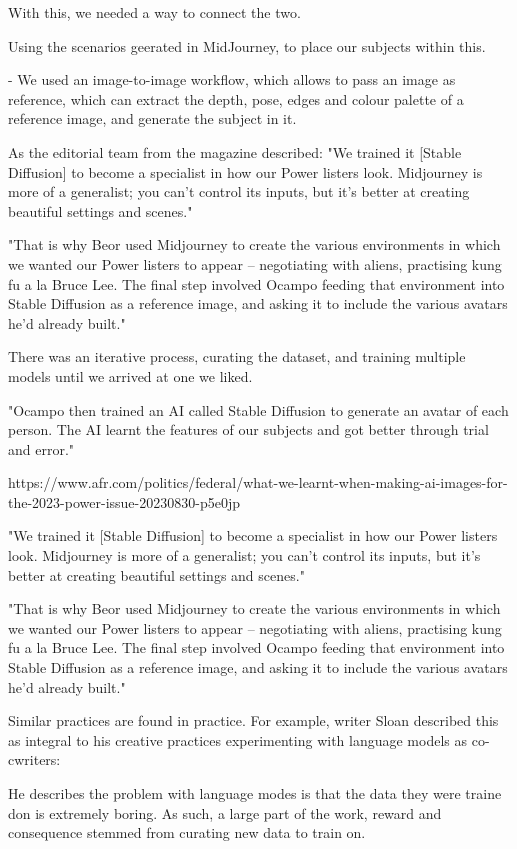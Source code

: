 With this, we needed a way to connect the two. 

Using the scenarios geerated in MidJourney, to place our subjects within this. 

- We used an image-to-image workflow, which allows to pass an image as reference, which can extract the depth, pose, edges and colour palette of a reference image, and generate the subject in it. 

As the editorial team from the magazine described: "We trained it [Stable Diffusion] to become a specialist in how our Power listers look. Midjourney is more of a generalist; you can’t control its inputs, but it’s better at creating beautiful settings and scenes."

"That is why Beor used Midjourney to create the various environments in which we wanted our Power listers to appear – negotiating with aliens, practising kung fu a la Bruce Lee. The final step involved Ocampo feeding that environment into Stable Diffusion as a reference image, and asking it to include the various avatars he’d already built."


There was an iterative process, curating the dataset, and training multiple models until we arrived at one we liked. 


"Ocampo then trained an AI called Stable Diffusion to generate an avatar of each person. The AI learnt the features of our subjects and got better through trial and error."

https://www.afr.com/politics/federal/what-we-learnt-when-making-ai-images-for-the-2023-power-issue-20230830-p5e0jp

"We trained it [Stable Diffusion] to become a specialist in how our Power listers look. Midjourney is more of a generalist; you can’t control its inputs, but it’s better at creating beautiful settings and scenes."

"That is why Beor used Midjourney to create the various environments in which we wanted our Power listers to appear – negotiating with aliens, practising kung fu a la Bruce Lee. The final step involved Ocampo feeding that environment into Stable Diffusion as a reference image, and asking it to include the various avatars he’d already built."

Similar practices are found in practice. For example, writer Sloan described this as integral to his creative practices experimenting with language models as co-cwriters:

He describes the problem with language modes is that the data they were traine don is extremely boring. 
As such, a large part of the work, reward and consequence stemmed from curating new data to train on. 

